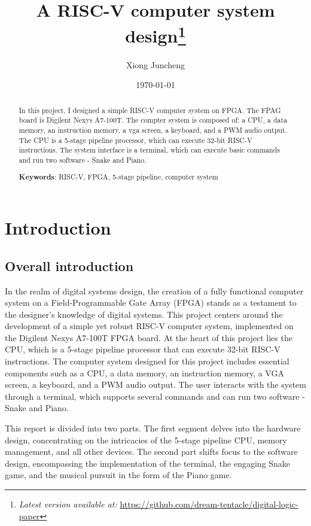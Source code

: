 \documentclass[12pt, a4paper, oneside]{article}
\title{\textbf{A RISC-V computer system design}\thanks{\textit{Latest version available at:} \url{https://github.com/dream-tentacle/digital-logic-paper}}}
\author{Xiong Juncheng}
\date{\today}
\begin{document}
\maketitle

\setcounter{page}{0}
\maketitle
\thispagestyle{empty}

\begin{abstract}
    In this project, I designed a simple RISC-V computer system on FPGA. The FPAG board is Digilent Nexys A7-100T. The compter system is composed of: a CPU, a data memory, an instruction memory, a vga screen, a keyboard, and a PWM audio output. The CPU is a 5-stage pipeline processor, which can execute 32-bit RISC-V instructions. The system interface is a terminal, which can execute basic commands and run two software - Snake and Piano.

    \textbf{Keywords}: RISC-V, FPGA, 5-stage pipeline, computer system
\end{abstract}
\newpage

\tableofcontents
\newpage

\setcounter{page}{1}
\section{Introduction}
\subsection{Overall introduction}

In the realm of digital systems design, the creation of a fully functional computer system on a Field-Programmable Gate Array (FPGA) stands as a testament to the designer's knowledge of digital systems. This project centers around the development of a simple yet robust RISC-V computer system, implemented on the Digilent Nexys A7-100T FPGA board. At the heart of this project lies the CPU, which is a 5-stage pipeline processor that can execute 32-bit RISC-V instructions. The computer system designed for this project includes essential components such as a CPU, a data memory, an instruction memory, a VGA screen, a keyboard, and a PWM audio output. The user interacts with the system through a terminal, which supports several commands and can run two software - Snake and Piano.

This report is divided into two parts. The first segment delves into the hardware design, concentrating on the intricacies of the 5-stage pipeline CPU, memory management, and all other devices. The second part shifts focus to the software design, encompassing the implementation of the terminal, the engaging Snake game, and the musical pursuit in the form of the Piano game.
\end{document}
